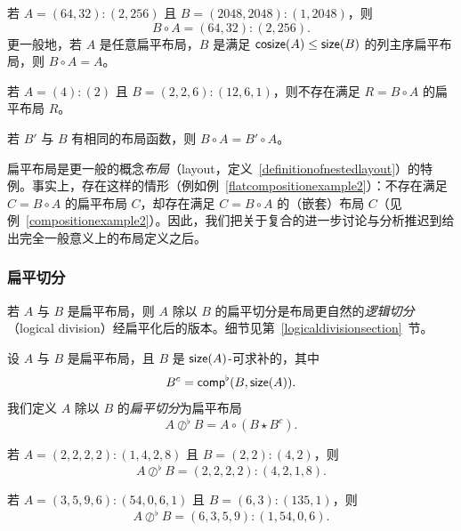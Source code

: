\begin{example}
    若 $A = (64,32):(2,256)$ 且 $B = (2048,2048):(1,2048)$，则
    \[
    B \circ A = (64,32):(2,256).
    \]
    更一般地，若 $A$ 是任意扁平布局，$B$ 是满足 $\mathsf{cosize}(A) \leq \mathsf{size}(B)$ 的列主序扁平布局，则 $B \circ A = A$。
\end{example}

\begin{example}\label{flatcompositionexample2}
    若 $A = (4):(2)$ 且 $B = (2,2,6):(12,6,1)$，则不存在满足 $R = B \circ A$ 的扁平布局 $R$。
\end{example}

\begin{remark}
    若 $B'$ 与 $B$ 有相同的布局函数，则 $B \circ A = B' \circ A$。
\end{remark}

\begin{remark} 扁平布局是更一般的概念{\it 布局}（layout，定义~\ref{definitionofnestedlayout}）的特例。事实上，存在这样的情形（例如例~\ref{flatcompositionexample2}）：不存在满足 $C = B \circ A$ 的扁平布局 $C$，却存在满足 $C = B \circ A$ 的（嵌套）布局 $C$（见例~\ref{compositionexample2}）。因此，我们把关于复合的进一步讨论与分析推迟到给出完全一般意义上的布局定义之后。
\end{remark}


\subsubsection{扁平切分}
若 $A$ 与 $B$ 是扁平布局，则 $A$ 除以 $B$ 的扁平切分是布局更自然的{\it 逻辑切分}（logical division）经扁平化后的版本。细节见第~\ref{logicaldivisionsection}~节。
\begin{definition}
设 $A$ 与 $B$ 是扁平布局，且 $B$ 是 $\mathsf{size}(A)$-可求补的，其中
\[
B^c = \mathsf{comp}^\flat(B,\mathsf{size}(A)).
\]
我们定义 $A$ 除以 $B$ 的{\it 扁平切分}为扁平布局
\[
A\oslash^\flat B = A \circ (B \star B^c).
\]
\end{definition}

\begin{example}
    若 $A = (2,2,2,2):(1,4,2,8)$ 且 $B = (2,2):(4,2)$，则
    \[
    A\oslash^\flat B = (2,2,2,2):(4,2,1,8).
    \]
\end{example}

\begin{example}
    若 $A = (3,5,9,6):(54,0,6,1)$ 且 $B = (6,3):(135,1)$，则
    \[
    A\oslash^\flat B = (6,3,5,9):(1,54,0,6).
    \]
\end{example}

